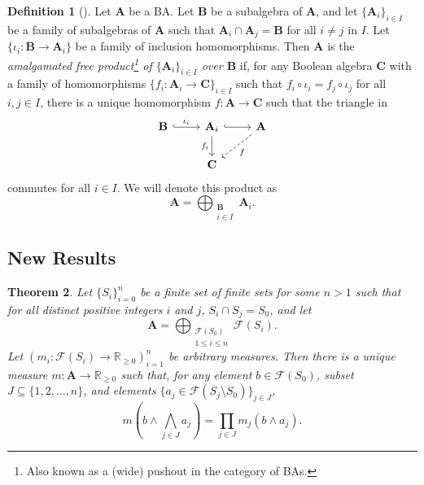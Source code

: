 \documentclass{article}
\newtheorem{theorem}{Theorem}
\theoremstyle{definition}
\newtheorem{definition}[theorem]{Definition}
\theoremstyle{remark}
\begin{document}
\begin{definition}[\cite{koppelberg1989handbook}]
  Let $\mathbf{A}$ be a BA. Let $\mathbf{B}$ be a subalgebra of $\mathbf{A}$,
  and let $\{ \mathbf{A}_i\}_{i \in I}$ be a family of subalgebras of $\mathbf{A}$
  such that $\mathbf{A}_i \cap \mathbf{A}_j = \mathbf{B}$ for all $i \ne j$ in
  $I$. Let $\{ \iota_i \colon \mathbf{B} \to \mathbf{A}_i \}$ be a family of
  inclusion homomorphisms. Then $\mathbf{A}$ is the \emph{amalgamated free
    product\footnote{Also known as a (wide) pushout in the category of BAs.} of
    $\{\mathbf{A}_{i} \}_{i \in I}$ over $\mathbf{B}$} if, for any Boolean
  algebra $\mathbf{C}$ with a family of homomorphisms $\{ f_i\colon \mathbf{A}_i
  \to \mathbf{C} \}_{i \in I}$ such that $f_i \circ \iota_i = f_j \circ \iota_j$
  for all $i, j \in I$, there is a unique homomorphism $f\colon \mathbf{A} \to
  \mathbf{C}$ such that the triangle in
  \[
    \begin{tikzcd}
      \mathbf{B} \ar[r,hookrightarrow,"\iota_i"] & \mathbf{A}_i
      \ar[r,hookrightarrow] \ar[d,swap,"f_i"] & \mathbf{A} \ar[ld,dashed,"f"] \\
      & \mathbf{C}
    \end{tikzcd}
  \]
  commutes for all $i \in I$. We will denote this product as
  \[
    \mathbf{A} = \bigoplus_{\substack{\mathbf{B}\\ i \in I}} \mathbf{A}_i.
  \]
\end{definition}

\subsection{New Results}

\begin{theorem}
  Let $\{ S_i \}_{i=0}^n$ be a finite set of finite sets for some $n > 1$ such
  that for all distinct positive integers $i$ and $j$, $S_i \cap S_j = S_0$, and
  let
  \[
    \mathbf{A} = \bigoplus_{\substack{\mathcal{F}(S_0)\\ 1 \le i \le n}}
    \mathcal{F}(S_i).
  \]
  Let $(m_i\colon \mathcal{F}(S_i) \to \mathbb{R}_{\ge 0})_{i=1}^n$ be arbitrary
  measures. Then there is a unique measure $m\colon \mathbf{A} \to
  \mathbb{R}_{\ge 0}$ such that, for any element $b \in \mathcal{F}(S_0)$,
  subset $J \subseteq \{ 1, 2, \dots, n \}$, and elements $\{ a_j \in
  \mathcal{F}(S_j \setminus S_0) \}_{j \in J}$,
  \[
    m \left(b \land \bigwedge_{j \in J} a_j \right) = \prod_{j \in J} m_j(b
    \land a_j).
  \]
\end{theorem}
\end{document}
